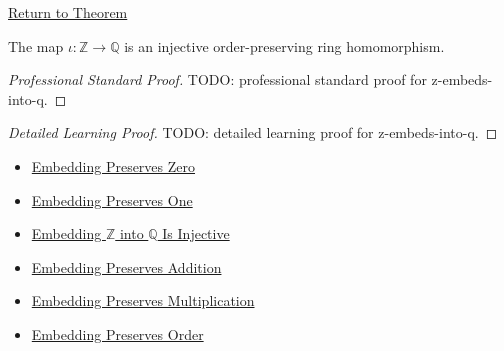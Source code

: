 \newpage
{}
\label{prf:z-embeds-into-q}

\begin{remark*}[Return]
\hyperref[thm:z-embeds-into-q]{Return to Theorem}
\end{remark*}

\begin{theorem*}
The map $\iota:\mathbb{Z}\to\mathbb{Q}$ is an injective order-preserving ring
homomorphism.
\end{theorem*}

\begin{proof}[Professional Standard Proof]
\LRAProofBodyStart
TODO: professional standard proof for z-embeds-into-q.
\end{proof}

\begin{proof}[Detailed Learning Proof]
\LRAProofBodyStart
TODO: detailed learning proof for z-embeds-into-q.
\end{proof}

\begin{remark*}
\end{remark*}

\begin{dependencies}
\begin{itemize}
  \item \hyperref[thm:embedding-z-into-q-preserves-zero]{Embedding Preserves Zero}
  \item \hyperref[thm:embedding-z-into-q-preserves-one]{Embedding Preserves One}
  \item \hyperref[thm:embedding-z-into-q-injective]{Embedding $\mathbb{Z}$ into $\mathbb{Q}$ Is Injective}
  \item \hyperref[thm:embedding-z-into-q-preserves-addition]{Embedding Preserves Addition}
  \item \hyperref[thm:embedding-z-into-q-preserves-multiplication]{Embedding Preserves Multiplication}
  \item \hyperref[thm:embedding-z-into-q-preserves-order]{Embedding Preserves Order}
\end{itemize}
\end{dependencies}

\clearpage
